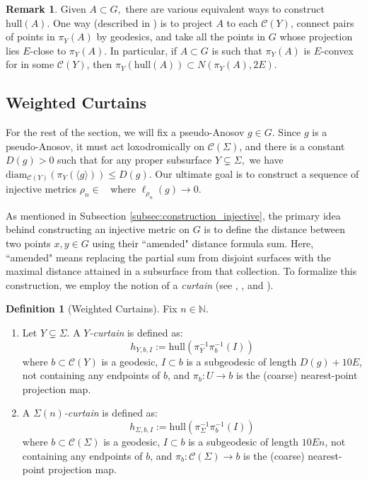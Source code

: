 \documentclass{amsart}
\numberwithin{thm}{section}
\numberwithin{figure}{section}
\theoremstyle{definition}
\newtheorem{remark}[thm]{Remark}
\theoremstyle{definition}
\newtheorem{defn}[thm]{Definition}
\theoremstyle{remark}
\newcommand{\hull}{\mathrm{hull}}
\numberwithin{equation}{section}
\DeclareMathOperator{\DDG}{\mathcal{D}(G)}
\theoremstyle{plain}
\begin{document}
\begin{remark}\label{rmk:constant_track} Given $A \subset G,$ there are various equivalent ways to construct $\hull(A)$. One way (described in \cite{Russell2018ConvexityIH}) is to project $A$ to each $\mathcal{C}(Y)$, connect pairs of points in $\pi_Y(A)$ by geodesics, and take all the points in $G$ whose projection lies  $E$-close to $\pi_Y(A).$ In particular, if $A \subset G$ is such that $\pi_Y(A)$ is $E$-convex for in some $\mathcal{C}(Y)$, then $\pi_Y(\hull(A)) \subset N(\pi_Y(A), 2E)$.
    
\end{remark}

\subsection{Weighted Curtains}\label{sec:fixed_p.A} For the rest of the section, we will fix a pseudo-Anosov $g \in G.$ Since $g$ is a pseudo-Anosov, it must act loxodromically on $\mathcal{C}(\Sigma)$, and there is a constant $D(g)>0$ such that for any proper subsurface $Y \subsetneq \Sigma,$ we have $\text{diam}_{\mathcal{C}(Y)}(\pi_Y(\langle g \rangle)) \leq D(g)$. Our ultimate goal is to construct a sequence of injective metrics $\rho_n \in \DDG$ where $\ell_{\rho_n}(g) \rightarrow 0$.



As mentioned in Subsection \ref{subsec:construction_injective}, the primary idea behind constructing an injective metric on $G$ is to define the distance between two points $x,y \in G$ using their ``amended" distance formula sum. Here, ``amended" means replacing the partial sum from disjoint surfaces with the maximal distance attained in a subsurface from that collection. To formalize this construction, we employ the notion of a \emph{curtain} (see \cite{PSZCAT}, \cite{zalloum:injectivity}, and \cite{PetytZalloum24}).

\begin{defn}[Weighted Curtains] \label{def:weights}
Fix $n \in \mathbb{N}$. 
\begin{enumerate}
    \item Let $Y \subsetneq \Sigma$. A \emph{$Y$-curtain} is defined as:
    \[
    h_{Y,b,I}:=\hull(\pi_Y^{-1}\pi_b^{-1}(I))
    \]
    where $b \subset \mathcal{C}(Y)$ is a geodesic, $I \subset b$ is a subgeodesic of length $D(g)+10E$, not containing any endpoints of $b$, and $\pi_b:U \to b$ is the (coarse) nearest-point projection map.
    
    \item A \emph{$\Sigma(n)$-curtain} is defined as:
    \[
    h_{\Sigma,b,I}:=\hull(\pi_\Sigma^{-1}\pi_b^{-1}(I))
    \]
    where $b \subset \mathcal{C}(\Sigma)$ is a geodesic, $I \subset b$ is a subgeodesic of length $10E n$, not containing any endpoints of $b$, and $\pi_b: \mathcal{C}(\Sigma) \to b$ is the (coarse) nearest-point projection map.
\end{enumerate}
\end{defn}
\end{document}
